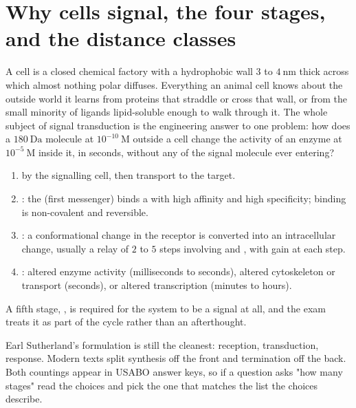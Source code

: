 
\section{Why cells signal, the four stages, and the distance classes}

A cell is a closed chemical factory with a hydrophobic wall $3$ to $4\ \mathrm{nm}$
thick across which almost nothing polar diffuses. Everything an animal cell knows
about the outside world it learns from proteins that straddle or cross that wall, or
from the small minority of ligands lipid-soluble enough to walk through it. The whole
subject of signal transduction is the engineering answer to one problem: how does a
$180\ \mathrm{Da}$ molecule at $10^{-10}\ \mathrm{M}$ outside a cell change the
activity of an enzyme at $10^{-5}\ \mathrm{M}$ inside it, in seconds, without any of
the signal molecule ever entering?

\begin{keybox}[title={MEMORIZE: the four stages of cell signalling}]
\begin{enumerate}
\item {} by the signalling cell, then transport to the target.
\item {}: the  (first messenger) binds a  with
high affinity and high specificity; binding is non-covalent and reversible.
\item {}: a conformational change in the receptor is converted into an
intracellular change, usually a relay of $2$ to $5$ steps involving  and , with gain at each step.
\item {}: altered enzyme activity (milliseconds to seconds), altered
cytoskeleton or transport (seconds), or altered transcription (minutes to hours).
\end{enumerate}
A fifth stage, , is required for the system to be a signal at all,
and the exam treats it as part of the cycle rather than an afterthought.
\end{keybox}

Earl Sutherland's formulation is still the cleanest: reception, transduction,
response. Modern texts split synthesis off the front and termination off the back.
Both countings appear in USABO answer keys, so if a question asks "how many stages"
read the choices and pick the one that matches the list the choices describe.

